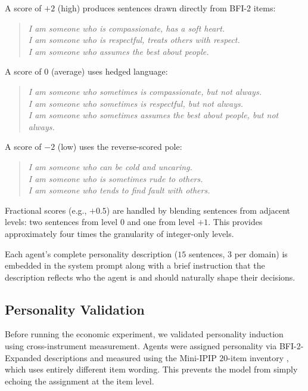 \documentclass[12pt, a4paper]{article}
\begin{document}
A score of $+2$ (high) produces sentences drawn directly from BFI-2 items:

\begin{quote}
\emph{I am someone who is compassionate, has a soft heart.} \\
\emph{I am someone who is respectful, treats others with respect.} \\
\emph{I am someone who assumes the best about people.}
\end{quote}

A score of $0$ (average) uses hedged language:

\begin{quote}
\emph{I am someone who sometimes is compassionate, but not always.} \\
\emph{I am someone who sometimes is respectful, but not always.} \\
\emph{I am someone who sometimes assumes the best about people, but not always.}
\end{quote}

A score of $-2$ (low) uses the reverse-scored pole:

\begin{quote}
\emph{I am someone who can be cold and uncaring.} \\
\emph{I am someone who is sometimes rude to others.} \\
\emph{I am someone who tends to find fault with others.}
\end{quote}

Fractional scores (e.g., $+0.5$) are handled by blending sentences from adjacent levels: two sentences from level $0$ and one from level $+1$. This provides approximately four times the granularity of integer-only levels.

Each agent's complete personality description ($15$ sentences, $3$ per domain) is embedded in the system prompt along with a brief instruction that the description reflects who the agent is and should naturally shape their decisions.

\subsection{Personality Validation}
\label{sec:validation}

Before running the economic experiment, we validated personality induction using cross-instrument measurement. Agents were assigned personality via BFI-2-Expanded descriptions and measured using the Mini-IPIP $20$-item inventory \citep{donnellan2006mini}, which uses entirely different item wording. This prevents the model from simply echoing the assignment at the item level.
\end{document}
